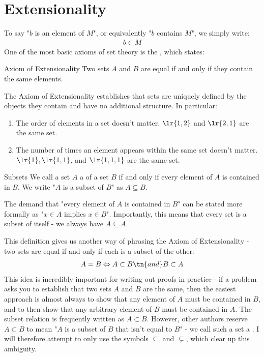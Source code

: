 \section{Extensionality}
To say "$b$ is an element of $M$", or equivalently "$b$ contains $M$", we simply write:
\begin{align*}
	b \in M
\end{align*}
One of the most basic axioms of set theory is the , which states:
\begin{axiom}{Axiom of Extensionality}{}
	Two sets $A$ and $B$ are equal if and only if they contain the same elements.
\end{axiom}
The Axiom of Extensionality establishes that sets are uniquely defined by the objects they contain and have no additional structure. In particular:
\begin{enumerate}
	\item The order of elements in a set doesn't matter. $\lr{1,2}$ and $\lr{2,1}$ are the same set.
	\item The number of times an element appears within the same set doesn't matter. $\lr{1}, \lr{1,1}$, and $\lr{1,1,1}$ are the same set.
\end{enumerate}
\begin{importantdefinition}{Subsets}{}
	We call a set $A$ a  of a set $B$ if and only if every element of $A$ is contained in $B$. We write "$A$ is a subset of $B$" as $A \subseteq B$.
\end{importantdefinition}
The demand that "every element of $A$ is contained in $B$" can be stated more formally as "$x \in A$ implies $x \in B$". Importantly, this means that every set is a subset of itself - we always have $A \subseteq A$.

\newpar
This definition gives us another way of phrasing the Axiom of Extensionality - two sets are equal if and only if each is a subset of the other:
\begin{align*}
	A = B \Leftrightarrow A \subset B \tn{ and } B \subset A
\end{align*}
This idea is incredibly important for writing out proofs in practice - if a problem asks you to establish that two sets $A$ and $B$ are the same, then the easiest approach is almost always to show that any element of $A$ must be contained in $B$, and to then show that any arbitrary element of $B$ must be contained in $A$.
\newpar
The subset relation is frequently written as $A \subset B$. However, other authors reserve $A \subset B$ to mean "$A$ is a subset of $B$ that isn't equal to $B$" - we call such a set a . I will therefore attempt to only use the symbols $\subseteq$ and $\subsetneq$, which clear up this ambiguity.
\newpar
